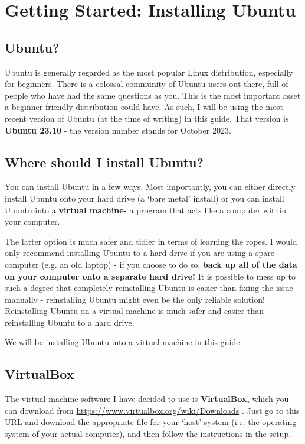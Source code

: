 \documentclass[12pt]{article}
\begin{document}
\pagebreak
\section{Getting Started: Installing Ubuntu}

\subsection{Ubuntu?}

Ubuntu is generally regarded as the most popular Linux distribution, especially for beginners. There is a colossal community of Ubuntu users out there, full of people who have had the same questions as you. This is the most important asset a beginner-friendly distribution could have. As such, I will be using the most recent version of Ubuntu (at the time of writing) in this guide. That version is \textbf{Ubuntu 23.10} - the version number stands for October 2023.

\subsection{Where should I install Ubuntu?}

You can install Ubuntu in a few ways. Most importantly, you can either directly install Ubuntu onto your hard drive (a `bare metal' install) or you can install Ubuntu into a \textbf{virtual machine-} a program that acts like a computer within your computer.

The latter option is much safer and tidier in terms of learning the ropes. I would only recommend installing Ubuntu to a hard drive if you are using a spare computer (e.g. an old laptop) - if you choose to do so, \textbf{back up all of the data on your computer onto a separate hard drive!} It is possible to mess up to such a degree that completely reinstalling Ubuntu is easier than fixing the issue manually - reinstalling Ubuntu might even be the only reliable solution! Reinstalling Ubuntu on a virtual machine is much safer and easier than reinstalling Ubuntu to a hard drive.

We will be installing Ubuntu into a virtual machine in this guide. 

\subsection{VirtualBox}

The virtual machine software I have decided to use is \textbf{VirtualBox,} which you can download from \url{https://www.virtualbox.org/wiki/Downloads} . Just go to this URL and download the appropriate file for your `host' system (i.e. the operating system of your actual computer), and then follow the instructions in the setup.
\end{document}

